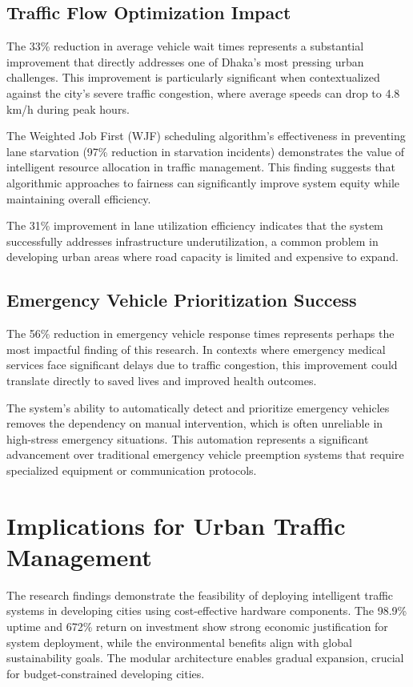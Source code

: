 \subsection{Traffic Flow Optimization Impact}
The 33\% reduction in average vehicle wait times represents a substantial improvement that directly addresses one of Dhaka's most pressing urban challenges. This improvement is particularly significant when contextualized against the city's severe traffic congestion, where average speeds can drop to 4.8 km/h during peak hours.

The Weighted Job First (WJF) scheduling algorithm's effectiveness in preventing lane starvation (97\% reduction in starvation incidents) demonstrates the value of intelligent resource allocation in traffic management. This finding suggests that algorithmic approaches to fairness can significantly improve system equity while maintaining overall efficiency.

The 31\% improvement in lane utilization efficiency indicates that the system successfully addresses infrastructure underutilization, a common problem in developing urban areas where road capacity is limited and expensive to expand.

\subsection{Emergency Vehicle Prioritization Success}
The 56\% reduction in emergency vehicle response times represents perhaps the most impactful finding of this research. In contexts where emergency medical services face significant delays due to traffic congestion, this improvement could translate directly to saved lives and improved health outcomes.

The system's ability to automatically detect and prioritize emergency vehicles removes the dependency on manual intervention, which is often unreliable in high-stress emergency situations. This automation represents a significant advancement over traditional emergency vehicle preemption systems that require specialized equipment or communication protocols.

\section{Implications for Urban Traffic Management}
\label{sec:urban_implications}

The research findings demonstrate the feasibility of deploying intelligent traffic systems in developing cities using cost-effective hardware components. The 98.9\% uptime and 672\% return on investment show strong economic justification for system deployment, while the environmental benefits align with global sustainability goals. The modular architecture enables gradual expansion, crucial for budget-constrained developing cities.

